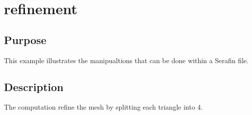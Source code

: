\chapter{refinement}
%
%
\section{Purpose}
This example illustrates the manipualtions that can be done within a Serafin
file.
%
\section{Description}
The computation refine the mesh by splitting each triangle into 4.

%
%
%
%
%
%
%
%
